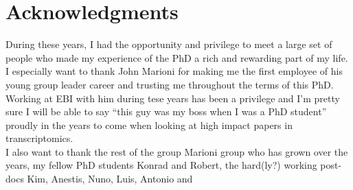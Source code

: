 
\bigskip

\begingroup
\let\clearpage\relax
\let\cleardoublepage\relax
\let\cleardoublepage\relax
\chapter*{Acknowledgments}
During these years, I had the opportunity and privilege to meet a large set of people who made my experience of the PhD a rich and rewarding part of my life.\\
I especially want to thank John Marioni for making me the first employee of his young group leader career and trusting me throughout the terms of this PhD. Working at EBI with him during tese years has been a privilege and I'm pretty sure I will be able to say ``this guy was my boss when I was a PhD student'' proudly in the years to come when looking at high impact papers in transcriptomics.\\
I also want to thank the rest of the group Marioni group who has grown over the years, my fellow PhD students Konrad and Robert, the hard(ly?) working post-docs Kim, Anestis, Nuno, Luis, Antonio and 

\bigskip



\endgroup



